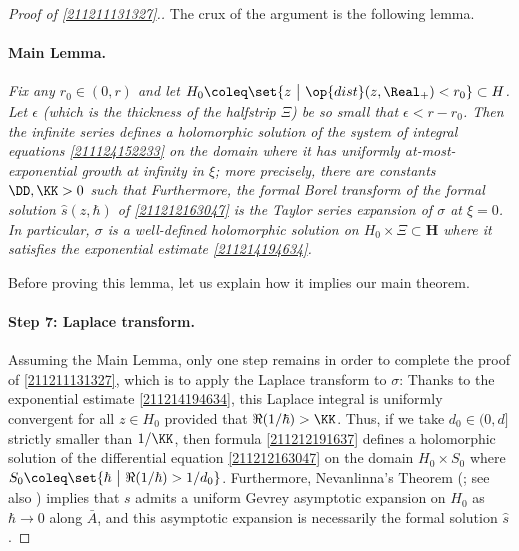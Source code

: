 \documentclass[11pt]{article}
\begin{document}
\begin{proof}[Proof of \autoref{211211131327}.]
The crux of the argument is the following lemma.

\paragraph*{Main Lemma.}
\textit{Fix any $r_0 \in (0, r)$ and let $H_0 \coleq \set{ z ~\big|~ \op{dist} (z, \Real_+) < r_0} \subset H$.
Let $\epsilon$ (which is the thickness of the halfstrip $\Xi$) be so small that $\epsilon < r - r_0$.
Then the infinite series 
defines a holomorphic solution of the system of integral equations \eqref{211124152233} on the domain
where it has uniformly at-most-exponential growth at infinity in $\xi$; more precisely, there are constants $\DD, \KK > 0$ such that
Furthermore, the formal Borel transform 
of the formal solution $\hat{s} (z, \hbar)$ of \eqref{211212163047} is the Taylor series expansion of $\sigma$ at $\xi = 0$.
In particular, $\sigma$ is a well-defined holomorphic solution on $H_0 \times \Xi \subset \mathbf{H}$ where it satisfies the exponential estimate \eqref{211214194634}.
}

Before proving this lemma, let us explain how it implies our main theorem.

\paragraph*{Step 7: Laplace transform.}
Assuming the Main Lemma, only one step remains in order to complete the proof of \autoref{211211131327}, which is to apply the Laplace transform to $\sigma$:
Thanks to the exponential estimate \eqref{211214194634}, this Laplace integral is uniformly convergent for all $z \in H_0$ provided that ${\Re (1/\hbar) > \KK}$.
Thus, if we take $d_0 \in (0, d]$ strictly smaller than $1/\KK$, then formula \eqref{211212191637} defines a holomorphic solution of the differential equation \eqref{211212163047} on the domain $H_0 \times S_0$ where $S_0 \coleq \set{ \hbar ~\big|~ \Re (1/\hbar) > 1 / d_0 }$.
Furthermore, Nevanlinna's Theorem  (\cite[pp.44-45]{nevanlinna1918theorie}; see also \cite[Theorem B.11]{MY2008.06492}) implies that $s$ admits a uniform Gevrey asymptotic expansion on $H_0$ as $\hbar \to 0$ along $\bar{A}$, and this asymptotic expansion is necessarily the formal solution $\hat{s}$.


\end{proof}
\end{document}
